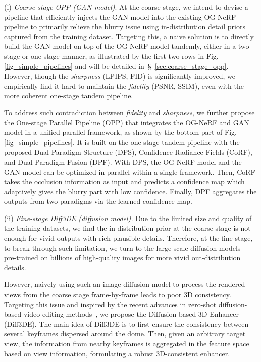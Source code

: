 (i) \textit{Coarse-stage OPP (GAN model)}. At the coarse stage, we intend to devise a pipeline that efficiently injects the GAN model into the existing OG-NeRF pipeline to primarily relieve the blurry issue using in-distribution detail priors captured from the training dataset. 
Targeting this, a naive solution is to directly build the GAN model on top of the OG-NeRF model tandemly, either in a two-stage or one-stage manner, as illustrated by the first two rows in Fig. \ref{fig_simple_pipelines} and will be detailed in~\S~\ref{sec:coarse_stage_opp}. However, though the \textit{sharpness} (LPIPS, FID) is significantly improved,  we empirically find it hard to maintain the \textit{fidelity} (PSNR, SSIM), even with the more coherent one-stage tandem pipeline. 

To address such contradiction between \textit{fidelity} and \textit{sharpness}, 
we further propose the One-stage Parallel Pipeline (OPP) that integrates the OG-NeRF and GAN model in a unified parallel framework, as shown by the bottom part of Fig. \ref{fig_simple_pipelines}. It is built on the one-stage tandem pipeline with the proposed  Dual-Paradigm Structure (DPS), Confidence Radiance Fields (CoRF), and Dual-Paradigm Fusion (DPF).
With DPS, the OG-NeRF model and the GAN model can be optimized in parallel within a single framework. Then, CoRF takes the occlusion information as input and predicts a confidence map which adaptively gives the blurry part with low confidence. Finally, DPF aggregates the outputs from two paradigms via the learned confidence map. 


(ii) \textit{Fine-stage Diff3DE (diffusion model).}  Due to the limited size and quality of the training datasets, we find the in-distribution prior at the coarse stage is not enough for vivid outputs with rich plausible details. Therefore, at the fine stage, to break through such limitation, we turn to the large-scale diffusion models~\cite{rombach2022LatentDiff,zhang2023addingControlNet} pre-trained on billions of high-quality images for more vivid out-distribution details. 

However, naively using such an image diffusion model to process the rendered views from the coarse stage frame-by-frame leads to poor 3D consistency. 
Targeting this issue and inspired by the recent advances in zero-shot diffusion-based video editing methods~\cite{yang2023rerender,geyer2023tokenflow}, we propose the Diffusion-based 3D Enhancer (Diff3DE). The main idea of Diff3DE is to first ensure the consistency between several keyframes dispersed around the dome. Then, given an arbitrary target view, the information from nearby keyframes is aggregated in the feature space based on view information, formulating a robust 3D-consistent enhancer. 


